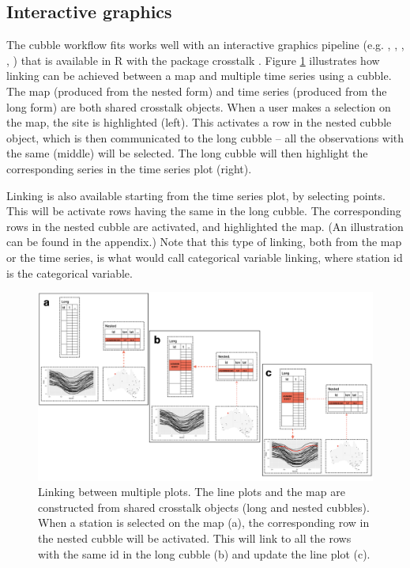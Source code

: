 \documentclass[
]{jss}
\begin{document}
\hypertarget{interactive-graphics}{%
\subsection{Interactive graphics}\label{interactive-graphics}}

The cubble workflow fits works well with an interactive graphics pipeline (e.g. \citet{buja1988elements}, \citet{buja1996interactive}, \citet{sutherland2000orca}, \citet{xie2014reactive}, \citet{cheng2016enabling}) that is available in R with the package crosstalk \citep{crosstalk}. Figure \ref{fig:illu-interactive} illustrates how linking can be achieved between a map and multiple time series using a cubble. The map (produced from the nested form) and time series (produced from the long form) are both shared crosstalk objects. When a user makes a selection on the map, the site is highlighted (left). This activates a row in the nested cubble object, which is then communicated to the long cubble -- all the observations with the same  (middle) will be selected. The long cubble will then highlight the corresponding series in the time series plot (right).

Linking is also available starting from the time series plot, by selecting points. This will be activate rows having the same  in the long cubble. The corresponding rows in the nested cubble are activated, and highlighted the map. (An illustration can be found in the appendix.) Note that this type of linking, both from the map or the time series, is what \citet{CS07} would call categorical variable linking, where station id is the categorical variable.

\begin{CodeChunk}
\begin{figure}

{\centering \includegraphics[width=1\linewidth,height=0.4\textheight]{../figures/diagram-keynotes/diagram-keynotes.004} 

}

\caption[Linking between multiple plots]{Linking between multiple plots. The line plots and the map are constructed from shared crosstalk objects (long and nested cubbles). When a station is selected on the map (a), the corresponding row in the nested cubble will be activated. This will link to all the rows with the same id in the long cubble (b) and update the line plot (c).}\label{fig:illu-interactive}
\end{figure}
\end{CodeChunk}
\end{document}
